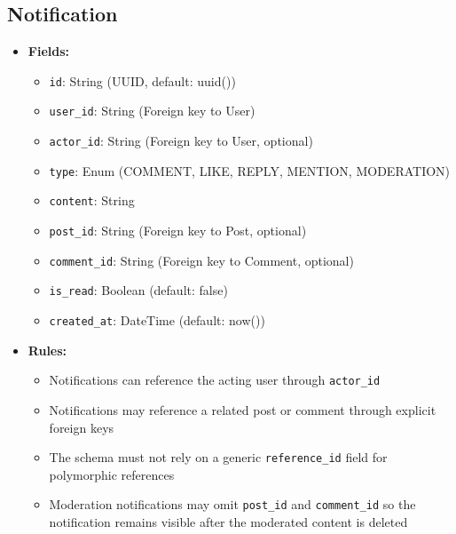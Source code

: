 \documentclass[11pt,a4paper]{article}
\begin{document}
\subsection{Notification}
\begin{itemize}
    \item \textbf{Fields:}
    \begin{itemize}
        \item \texttt{id}: String (UUID, default: uuid())
        \item \texttt{user\_id}: String (Foreign key to User)
        \item \texttt{actor\_id}: String (Foreign key to User, optional)
        \item \texttt{type}: Enum (COMMENT, LIKE, REPLY, MENTION, MODERATION)
        \item \texttt{content}: String
        \item \texttt{post\_id}: String (Foreign key to Post, optional)
        \item \texttt{comment\_id}: String (Foreign key to Comment, optional)
        \item \texttt{is\_read}: Boolean (default: false)
        \item \texttt{created\_at}: DateTime (default: now())
    \end{itemize}
    \item \textbf{Rules:}
    \begin{itemize}
        \item Notifications can reference the acting user through \texttt{actor\_id}
        \item Notifications may reference a related post or comment through explicit foreign keys
        \item The schema must not rely on a generic \texttt{reference\_id} field for polymorphic references
        \item Moderation notifications may omit \texttt{post\_id} and \texttt{comment\_id} so the notification remains visible after the moderated content is deleted
    \end{itemize}
\end{itemize}
\end{document}
